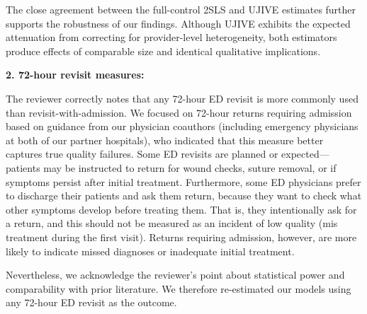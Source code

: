 \documentclass[11pt]{article}
\newcommand{\1}{\hbox{\rm 1\kern-.35em 1}}
\begin{document}
The close agreement between the full-control 2SLS and UJIVE estimates further supports the robustness of our findings. Although UJIVE exhibits the expected attenuation from correcting for provider-level heterogeneity, both estimators produce effects of comparable size and identical qualitative implications.

\textbf{2. 72-hour revisit measures:} 

The reviewer correctly notes that any 72-hour ED revisit is more commonly used than revisit-with-admission. We focused on 72-hour returns requiring admission based on guidance from our physician coauthors (including emergency physicians at both of our partner hospitals), who indicated that this measure better captures true quality failures. Some ED revisits are planned or expected---patients may be instructed to return for wound checks, suture removal, or if symptoms persist after initial treatment. Furthermore, some ED physicians prefer to discharge their patients and ask them return, because they want to check what other symptoms develop before treating them. That is, they intentionally ask for a return, and this should not be measured as an incident of low quality (mis treatment during the first visit). Returns requiring admission, however, are more likely to indicate missed diagnoses or inadequate initial treatment.

Nevertheless, we acknowledge the reviewer's point about statistical power and comparability with prior literature. We therefore re-estimated our models using any 72-hour ED revisit as the outcome.
\end{document}
